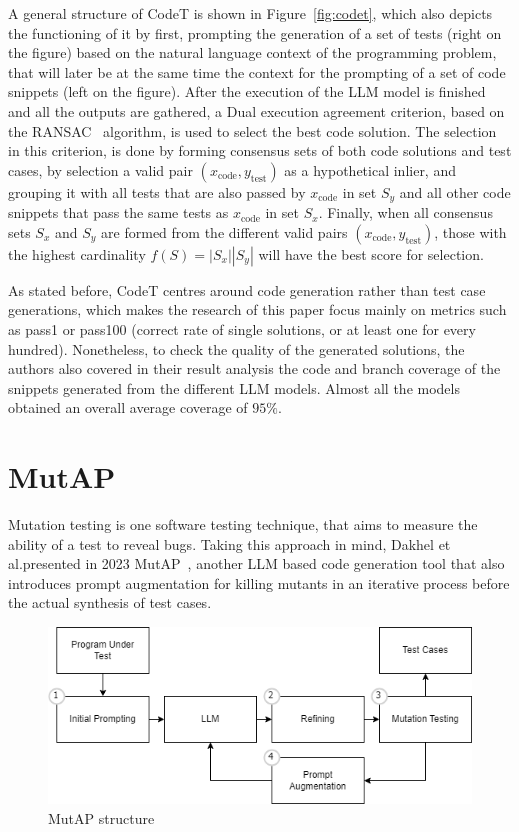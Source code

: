 \documentclass[%
  chapterprefix=false,%
  open=right,%
  twoside=true,%
  paper=a4,%
  logofile={Figures/logo.png},%
  thesistype=master,%
  UKenglish,%
]{se2thesis}
\begin{document}
A general structure of CodeT is shown in Figure~\ref{fig:codet}, which also depicts the functioning of it by first, prompting the generation of a set of tests (right on the figure) based on the natural language context of the programming problem, that will later be at the same time the context for the prompting of a set of code snippets (left on the figure).
After the execution of the LLM model is finished and all the outputs are gathered, a Dual execution agreement criterion, based on the RANSAC~\cite{DBLP:journals/cacm/FischlerB81} algorithm, is used to select the best code solution.
The selection in this criterion, is done by forming consensus sets of both code solutions and test cases, by selection a valid pair \((x_\text{code}, y_\text{test})\) as a hypothetical inlier, and grouping it with all tests that are also passed by \(x_\text{code}\) in set \(S_y\) and all other code snippets that pass the same tests as \(x_\text{code}\) in set \(S_x\).
Finally, when all consensus sets \(S_x\) and \(S_y\) are formed from the different valid pairs \((x_\text{code}, y_\text{test})\), those with the highest cardinality \(f(S) = |S_x||S_y|\) will have the best score for selection.

As stated before, CodeT centres around code generation rather than test case generations, which makes the research of this paper focus mainly on metrics such as pass1 or pass100 (correct rate of single solutions, or at least one for every hundred).
Nonetheless, to check the quality of the generated solutions, the authors also covered in their result analysis the code and branch coverage of the snippets generated from the different LLM models.
Almost all the models obtained an overall average coverage of \(95\%\).

\section{MutAP}

Mutation testing is one software testing technique, that aims to measure the ability of a test to reveal bugs.
Taking this approach in mind, Dakhel et al.\@ presented in 2023 MutAP~\cite{DBLP:journals/corr/abs-2308-16557}, another LLM based code generation tool that also introduces prompt augmentation for killing mutants in an iterative process before the actual synthesis of test cases.

\begin{figure}[tb]
  \centering 
  \includegraphics[width=.99\textwidth]{Figures/mutap.png}
  \caption{MutAP structure}\label{fig:mutap}
\end{figure}
\end{document}
